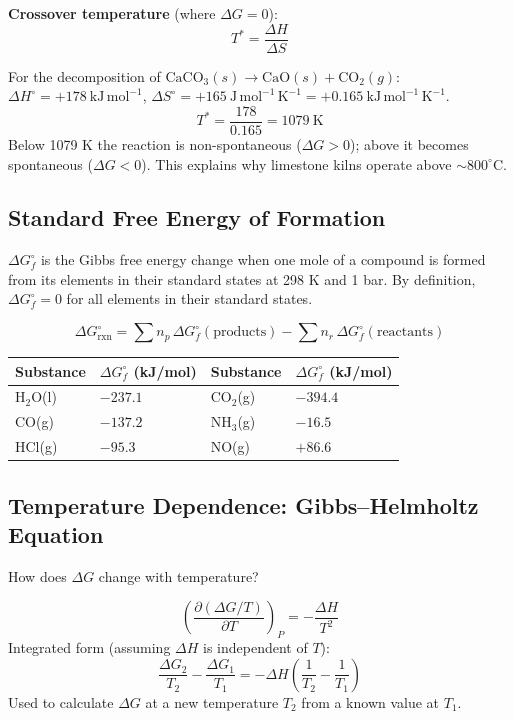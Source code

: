 \documentclass[12pt,a4paper]{article}
\begin{document}
\textbf{Crossover temperature} (where $\Delta G = 0$):
\[
T^* = \frac{\Delta H}{\Delta S}
\]

\begin{tcolorbox}[examplebox, title={Solved Example: Crossover Temperature}]
For the decomposition of $\mathrm{CaCO_3}(s) \to \mathrm{CaO}(s) + \mathrm{CO_2}(g)$:
$\Delta H^\circ = +178\ \mathrm{kJ\,mol^{-1}}$, $\Delta S^\circ = +165\ \mathrm{J\,mol^{-1}\,K^{-1}} = +0.165\ \mathrm{kJ\,mol^{-1}\,K^{-1}}$.
\[
T^* = \frac{178}{0.165} = 1079\ \mathrm{K}
\]
Below 1079 K the reaction is non-spontaneous ($\Delta G > 0$); above it becomes spontaneous ($\Delta G < 0$). This explains why limestone kilns operate above $\sim 800^\circ\mathrm{C}$.
\end{tcolorbox}

\subsection{Standard Free Energy of Formation}
\begin{tcolorbox}[defbox]
$\Delta G_f^\circ$ is the Gibbs free energy change when one mole of a compound is formed from its elements in their standard states at 298 K and 1 bar. By definition, $\Delta G_f^\circ = 0$ for all elements in their standard states.
\end{tcolorbox}

\[
\Delta G^\circ_{\mathrm{rxn}} = \sum n_p\,\Delta G_f^\circ(\text{products}) - \sum n_r\,\Delta G_f^\circ(\text{reactants})
\]

\begin{tabularx}{\linewidth}{|B{3.2cm}|Y|B{3.2cm}|Y|}
\hline
\textbf{Substance} & \textbf{$\Delta G_f^\circ$ (kJ/mol)} & \textbf{Substance} & \textbf{$\Delta G_f^\circ$ (kJ/mol)} \\
\hline
H$_2$O(l) & $-237.1$ & CO$_2$(g) & $-394.4$ \\
\hline
CO(g) & $-137.2$ & NH$_3$(g) & $-16.5$ \\
\hline
HCl(g) & $-95.3$ & NO(g) & $+86.6$ \\
\hline
\end{tabularx}

\subsection{Temperature Dependence: Gibbs--Helmholtz Equation}
How does $\Delta G$ change with temperature?

\begin{tcolorbox}[formulabox, title={Gibbs--Helmholtz Equation}]
\[
\left(\frac{\partial(\Delta G/T)}{\partial T}\right)_P = -\frac{\Delta H}{T^2}
\]
Integrated form (assuming $\Delta H$ is independent of $T$):
\[
\frac{\Delta G_2}{T_2} - \frac{\Delta G_1}{T_1} = -\Delta H\!\left(\frac{1}{T_2} - \frac{1}{T_1}\right)
\]
Used to calculate $\Delta G$ at a new temperature $T_2$ from a known value at $T_1$.
\end{tcolorbox}
\end{document}
